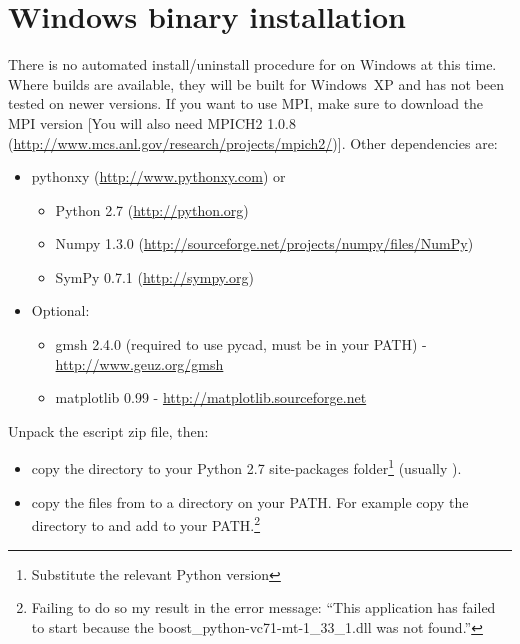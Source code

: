 %
%
%

\chapter{Windows binary installation}
\label{chap:winstall}

There is no automated install/uninstall procedure for \esfinley on Windows at this time.
Where builds are available, they will be built for Windows~XP and has not been tested on newer versions.
If you want to use MPI, make sure to download the MPI version [You will also need 
MPICH2 1.0.8 (\url{http://www.mcs.anl.gov/research/projects/mpich2/})].
Other dependencies are:
\begin{itemize}
 \item pythonxy (\url{http://www.pythonxy.com}) or 
  \begin{itemize}
	\item Python 2.7 (\url{http://python.org})
	\item Numpy 1.3.0 (\url{http://sourceforge.net/projects/numpy/files/NumPy})
	\item SymPy 0.7.1 (\url{http://sympy.org})
  \end{itemize}
  \item Optional:
  \begin{itemize}
      \item gmsh 2.4.0 (required to use pycad, must be in your PATH) - \url{http://www.geuz.org/gmsh}
    \item matplotlib 0.99 - \url{http://matplotlib.sourceforge.net}
  \end{itemize}
\end{itemize}


Unpack the escript zip file, then:
\begin{itemize}
\item 
 copy the  directory to your Python 2.7 site-packages folder\footnote{Substitute the relevant
 Python version}
 (usually ).
\item 
 copy the  files from  to a directory on your PATH. For example copy the directory to  and add   to your PATH.\footnote{Failing to do so my result in the error message:
``This application has failed to start because the boost_python-vc71-mt-1_33_1.dll was not found.''
}
\end{itemize}